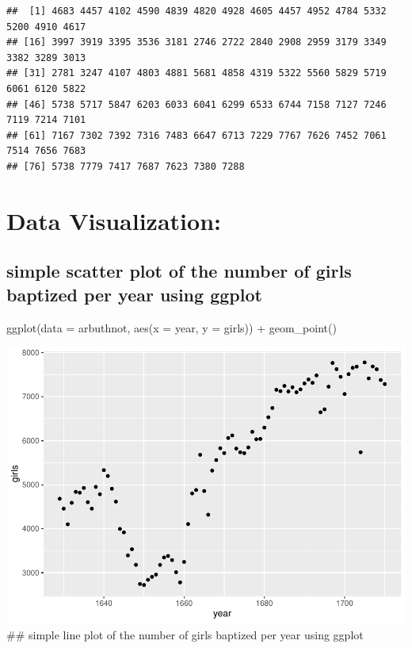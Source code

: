 \documentclass[
]{article}
\newenvironment{Shaded}{\begin{snugshade}}{\end{snugshade}}
\newcommand{\AttributeTok}[1]{\textcolor[rgb]{0.77,0.63,0.00}{#1}}
\newcommand{\FunctionTok}[1]{\textcolor[rgb]{0.00,0.00,0.00}{#1}}
\newcommand{\NormalTok}[1]{#1}
\newcommand{\SpecialCharTok}[1]{\textcolor[rgb]{0.00,0.00,0.00}{#1}}
\begin{document}
\begin{Shaded}
\end{Shaded}

\begin{verbatim}
##  [1] 4683 4457 4102 4590 4839 4820 4928 4605 4457 4952 4784 5332 5200 4910 4617
## [16] 3997 3919 3395 3536 3181 2746 2722 2840 2908 2959 3179 3349 3382 3289 3013
## [31] 2781 3247 4107 4803 4881 5681 4858 4319 5322 5560 5829 5719 6061 6120 5822
## [46] 5738 5717 5847 6203 6033 6041 6299 6533 6744 7158 7127 7246 7119 7214 7101
## [61] 7167 7302 7392 7316 7483 6647 6713 7229 7767 7626 7452 7061 7514 7656 7683
## [76] 5738 7779 7417 7687 7623 7380 7288
\end{verbatim}

\hypertarget{data-visualization}{%
\section{Data Visualization:}\label{data-visualization}}

\hypertarget{simple-scatter-plot-of-the-number-of-girls-baptized-per-year-using-ggplot}{%
\subsection{simple scatter plot of the number of girls baptized per year
using
ggplot}\label{simple-scatter-plot-of-the-number-of-girls-baptized-per-year-using-ggplot}}

\begin{Shaded}
\begin{Highlighting}[]
\FunctionTok{ggplot}\NormalTok{(}\AttributeTok{data =}\NormalTok{ arbuthnot, }\FunctionTok{aes}\NormalTok{(}\AttributeTok{x =}\NormalTok{ year, }\AttributeTok{y =}\NormalTok{ girls)) }\SpecialCharTok{+} 
  \FunctionTok{geom\_point}\NormalTok{()}
\end{Highlighting}
\end{Shaded}

\includegraphics{week1_practice_files/figure-latex/unnamed-chunk-9-1.pdf}
\#\# simple line plot of the number of girls baptized per year using
ggplot
\end{document}
